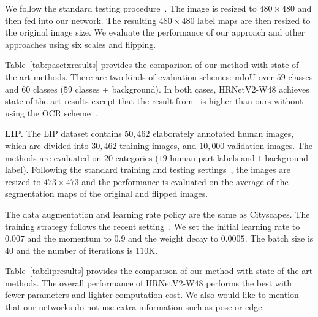 \documentclass[10pt,journal,compsoc]{IEEEtran}
\begin{document}
We follow the standard testing procedure~\cite{0005DSZWTA18, DingJSL018}. 
The image is resized to $480\times480$ 
and then fed into our network.
The resulting $480\times480$ label maps are then resized to the 
original image size. 
We evaluate the performance of our approach and other approaches
using six scales and flipping.

 
Table~\ref{tab:pasctxresults}
provides the comparison of our method
with state-of-the-art methods. 
There are two kinds of evaluation schemes:
mIoU over $59$ classes and $60$ classes ($59$ classes + background).
In both cases, 
HRNetV$2$-W$48$ achieves state-of-the-art results
except that the result from~\cite{HeDZWQ} is higher than ours without using the OCR scheme~\cite{YuanCW18}.


	
	

\vspace{.1cm}
\noindent\textbf{LIP.}
The LIP dataset \cite{GongLSL17} 
contains $50,462$ elaborately annotated human images,
which are divided into $30,462$ training images,
and $10,000$ validation images. The methods are evaluated on 
$20$ categories ($19$ human part labels and 
$1$ background label). 
Following the standard training and testing settings~\cite{TL18}, the images are resized to $473\times473$ and
the performance is evaluated
on the average of the segmentation maps of the original and flipped images.

The data augmentation and learning rate policy are the same as Cityscapes. 
The training strategy follows the recent setting~\cite{TL18}. 
We set the initial learning rate to $0.007$ and 
the momentum to $0.9$ and the weight decay to $0.0005$.
The batch size is $40$ and the number of iterations is $110$K. 

Table~\ref{tab:lipresults}
provides the comparison of our method
with state-of-the-art methods. 
The overall performance of HRNetV$2$-W$48$
performs the best 
with fewer parameters and lighter computation cost.
We also would like to mention that
our networks do not use extra information such as pose or edge.
\end{document}
